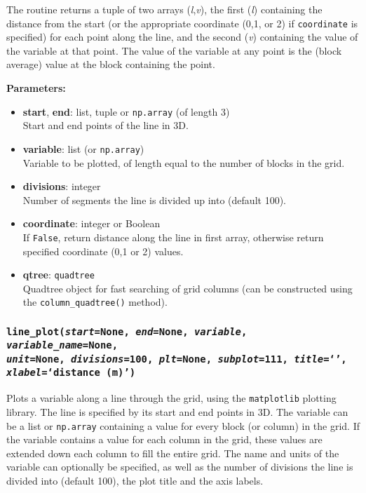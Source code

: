 The routine returns a tuple of two arrays (\emph{l},\emph{v}), the first (\emph{l}) containing the distance from the start (or the appropriate coordinate (0,1, or 2) if \texttt{coordinate} is specified) for each point along the line, and the second (\emph{v}) containing the value of the variable at that point.  The value of the variable at any point is the (block average) value at the block containing the point.

\textbf{Parameters:}
\begin{itemize}
\item \textbf{start}, \textbf{end}: list, tuple or \texttt{np.array} (of length 3)\\
  Start and end points of the line in 3D.
\item \textbf{variable}: list (or \texttt{np.array})\\
  Variable to be plotted, of length equal to the number of blocks in the grid.
\item \textbf{divisions}: integer\\
  Number of segments the line is divided up into (default 100).
\item \textbf{coordinate}: integer or Boolean\\
  If \texttt{False}, return distance along the line in first array, otherwise return specified coordinate (0,1 or 2) values.
\item \textbf{qtree}: \texttt{quadtree}\\
  Quadtree object for fast searching of grid columns (can be constructed using the \texttt{column\_quadtree()} method).
\end{itemize}

\subsubsection{\texttt{line\_plot(\emph{start}=None, \emph{end}=None, \emph{variable}, \emph{variable\_name}=None,\\
\emph{unit}=None, \emph{divisions}=100, \emph{plt}=None, \emph{subplot}=111, \emph{title}=`',\\
\emph{xlabel}=`distance (m)')}}
\label{sec:line_plot}

Plots a variable along a line through the grid, using the \texttt{matplotlib} plotting library. The line is specified by its start and end points in 3D.  The variable can be a list or \texttt{np.array} containing a value for every block (or column) in the grid.  If the variable contains a value for each column in the grid, these values are extended down each column to fill the entire grid.  The name and units of the variable can optionally be specified, as well as the number of divisions the line is divided into (default 100), the plot title and the axis labels.

